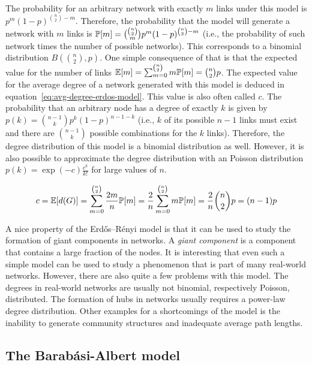 The probability for an arbitrary network with exactly \(m\) links under this model is \(p^{m} (1-p)^{\binom{n}{2} - m}\).
Therefore, the probability that the model will generate a network with \(m\) links is \(\mathbb{P}[{m}] = \binom{\binom{n}{2}}{m} p^{m} (1-p)^{\binom{n}{2} - m}\) (i.e., the probability of such network times the number of possible networks).
This corresponds to  a binomial distribution \(B(\binom{n}{2}, p)\).
One simple consequence of that is that the expected value for the number of links \(\mathbb{E}[{m}] = \sum_{m=0}^{\binom{n}{2}} m \mathbb{P}[{m}] = \binom{n}{2} p\).
The expected value for the average degree of a network generated with this model is deduced in equation~\ref{eq:avg-degree-erdos-model}.
This value is also often called \(c\).
The probability that an arbitrary node has a degree of exactly \(k\) is given by \(p(k) = \binom{n-1}{k} p^{k} (1-p)^{n-1-k}\) (i.e., \(k\) of its possible \(n-1\) links must exist and there are \(\binom{n-1}{k}\) possible combinations for the \(k\) links).
Therefore, the degree distribution of this model is a binomial distribution as well.
However, it is also possible to approximate the degree distribution with an Poisson distribution \(p(k) = \exp(-c) \frac{c^{k}}{k!}\) for large values of \(n\).

\begin{equation}
  c = \mathbb{E}[{d(G)}] = \sum_{m=0}^{\binom{n}{2}} \frac{2m}{n} \mathbb{P}[{m}] = \frac{2}{n} \sum_{m=0}^{\binom{n}{2}} m \mathbb{P}[{m}] = \frac{2}{n} \binom{n}{2} p = (n-1) p
  \label{eq:avg-degree-erdos-model}
\end{equation}

A nice property of the Erdős–Rényi model is that it can be used to study the formation of giant components in networks.
A \emph{giant component} is a component that contains a large fraction of the nodes.
It is interesting that even such a simple model can be used to study a phenomenon that is part of many real-world networks.
However, there are also quite a few problems with this model.
The degrees in real-world networks are usually not binomial, respectively Poisson, distributed.
The formation of hubs in networks usually requires a power-law degree distribution.
Other examples for a shortcomings of the model is the inability to generate community structures and inadequate average path lengths.


\subsection{The Barabási-Albert model}

